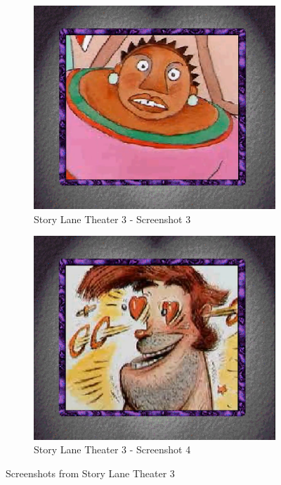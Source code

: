 \begin{figure}[H]
    \begin{subfigure}{0.45\textwidth}
        \centering
        \includegraphics[width=\linewidth]{Games/StoryLaneTheater/Images/StoryLaneTheater3Image3.png}
        \caption{Story Lane Theater 3 - Screenshot 3}
    \end{subfigure}
    \begin{subfigure}{0.45\textwidth}
        \centering
        \includegraphics[width=\linewidth]{Games/StoryLaneTheater/Images/StoryLaneTheater3Image4.png}
        \caption{Story Lane Theater 3 - Screenshot 4}
    \end{subfigure}
    \caption{Screenshots from Story Lane Theater 3}
\end{figure}